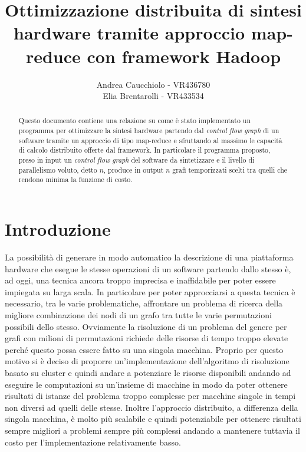 \documentclass[]{IEEEtran}
\title{Ottimizzazione distribuita di sintesi hardware tramite approccio map-reduce con framework Hadoop}
\author{Andrea Caucchiolo - VR436780\\Elia Brentarolli - VR433534}
\begin{document}
\maketitle

\begin{abstract}
	
Questo documento contiene una relazione su come è stato implementato un programma per ottimizzare la sintesi hardware partendo dal \emph{control flow graph} di un software tramite un  approccio di tipo map-reduce e sfruttando al massimo le capacità di calcolo distribuito offerte dal framework. In particolare il programma proposto, preso in input un \emph{control flow graph} del software da sintetizzare e il livello di parallelismo voluto, detto $n$, produce in output $n$ grafi temporizzati scelti tra quelli che rendono minima la funzione di costo.

\end{abstract}


\section{Introduzione}

La possibilità di generare in modo automatico la descrizione di una piattaforma hardware che esegue le stesse operazioni di un software partendo dallo stesso è, ad oggi, una tecnica ancora troppo imprecisa e inaffidabile per poter essere impiegata su larga scala. In particolare per poter approcciarsi a questa tecnica è necessario, tra le varie problematiche, affrontare un problema di ricerca della migliore combinazione dei nodi di un grafo tra tutte le varie permutazioni possibili dello stesso. Ovviamente la risoluzione di un problema del genere per grafi con milioni di permutazioni richiede delle risorse di tempo troppo elevate perché questo possa essere fatto su una singola macchina. Proprio per questo motivo si è deciso di proporre un'implementazione dell'algoritmo di risoluzione basato su cluster e quindi andare a potenziare le risorse disponibili andando ad eseguire le computazioni su un'insieme di macchine in modo da poter ottenere risultati di istanze del problema troppo complesse per macchine singole in tempi non diversi ad quelli delle stesse. Inoltre l'approccio distribuito, a differenza della singola macchina, è molto più scalabile e quindi potenziabile per ottenere risultati sempre migliori a problemi sempre più complessi andando a mantenere tuttavia il costo per l'implementazione relativamente basso.
\end{document}
